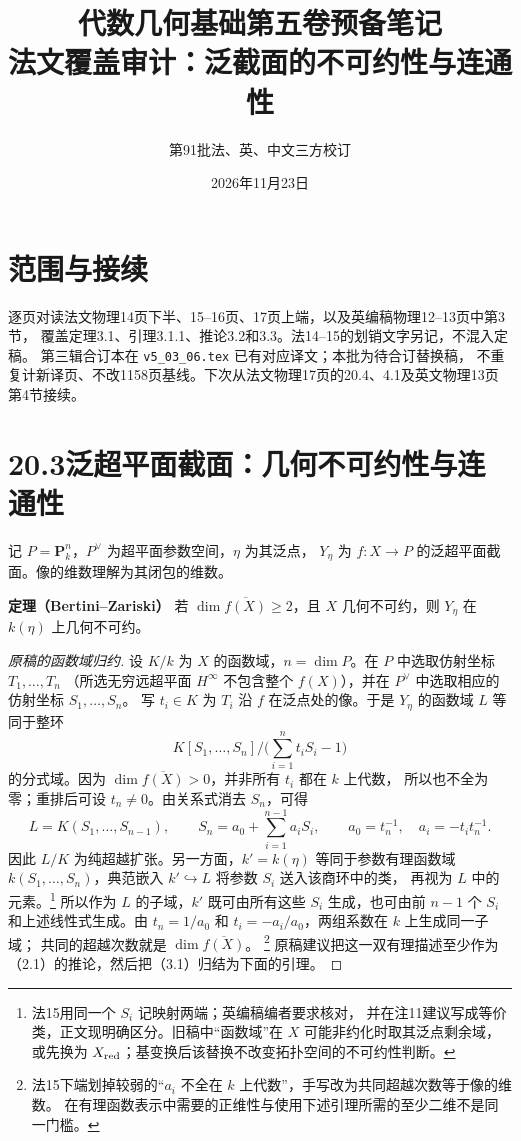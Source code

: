\documentclass[openany,fontset=fandol]{ctexbook}
\newcommand{\PP}{\mathbf P}
\newcommand{\tagitem}[2]{\par\medskip\noindent\textbf{#1\quad #2}\enspace}
\begin{document}
\title{代数几何基础第五卷预备笔记\\法文覆盖审计：泛截面的不可约性与连通性}
\author{第91批\quad 法、英、中文三方校订}
\date{2026年11月23日}
\maketitle

\section*{范围与接续}
逐页对读法文物理14页下半、15--16页、17页上端，以及英编稿物理12--13页中第3节，
覆盖定理3.1、引理3.1.1、推论3.2和3.3。法14--15的划销文字另记，不混入定稿。
第三辑合订本在 \texttt{v5\_03\_06.tex} 已有对应译文；本批为待合订替换稿，
不重复计新译页、不改1158页基线。下次从法文物理17页的20.4、4.1及英文物理13页第4节接续。

\section*{20.3\quad 泛超平面截面：几何不可约性与连通性}
记 $P=\PP^n_k$，$P^\vee$ 为超平面参数空间，$\eta$ 为其泛点，
$Y_\eta$ 为 $f:X\to P$ 的泛超平面截面。像的维数理解为其闭包的维数。

\tagitem{定理}{3.1（Bertini--Zariski）}
若 $\dim\overline{f(X)}\ge 2$，且 $X$ 几何不可约，则 $Y_\eta$ 在 $k(\eta)$ 上几何不可约。

\begin{proof}[原稿的函数域归约]
设 $K/k$ 为 $X$ 的函数域，$n=\dim P$。在 $P$ 中选取仿射坐标 $T_1,\ldots,T_n$
（所选无穷远超平面 $H^\infty$ 不包含整个 $f(X)$），并在 $P^\vee$ 中选取相应的仿射坐标 $S_1,\ldots,S_n$。
写 $t_i\in K$ 为 $T_i$ 沿 $f$ 在泛点处的像。于是 $Y_\eta$ 的函数域 $L$ 等同于整环
\[
 K[S_1,\ldots,S_n]\big/\bigl(\textstyle\sum_{i=1}^n t_i S_i-1\bigr)
\]
的分式域。因为 $\dim\overline{f(X)}>0$，并非所有 $t_i$ 都在 $k$ 上代数，
所以也不全为零；重排后可设 $t_n\ne 0$。由关系式消去 $S_n$，可得
\[
 L=K(S_1,\ldots,S_{n-1}),\qquad
 S_n=a_0+\sum_{i=1}^{n-1}a_iS_i,\qquad
 a_0=t_n^{-1},\quad a_i=-t_i t_n^{-1}.
\]
因此 $L/K$ 为纯超越扩张。另一方面，$k'=k(\eta)$ 等同于参数有理函数域
$k(S_1,\ldots,S_n)$，典范嵌入 $k'\hookrightarrow L$ 将参数 $S_i$ 送入该商环中的类，
再视为 $L$ 中的元素。\footnote{法15用同一个 $S_i$ 记映射两端；英编稿编者要求核对，
并在注11建议写成等价类，正文现明确区分。旧稿中“函数域”在 $X$ 可能非约化时取其泛点剩余域，
或先换为 $X_{\rm red}$；基变换后该替换不改变拓扑空间的不可约性判断。}
所以作为 $L$ 的子域，$k'$ 既可由所有这些 $S_i$ 生成，也可由前 $n-1$ 个
$S_i$ 和上述线性式生成。由 $t_n=1/a_0$ 和 $t_i=-a_i/a_0$，两组系数在 $k$ 上生成同一子域；
共同的超越次数就是 $\dim\overline{f(X)}$。
\footnote{法15下端划掉较弱的“$a_i$ 不全在 $k$ 上代数”，手写改为共同超越次数等于像的维数。
在有理函数表示中需要的正维性与使用下述引理所需的至少二维不是同一门槛。}
原稿建议把这一双有理描述至少作为（2.1）的推论，然后把（3.1）归结为下面的引理。
\end{proof}
\end{document}

